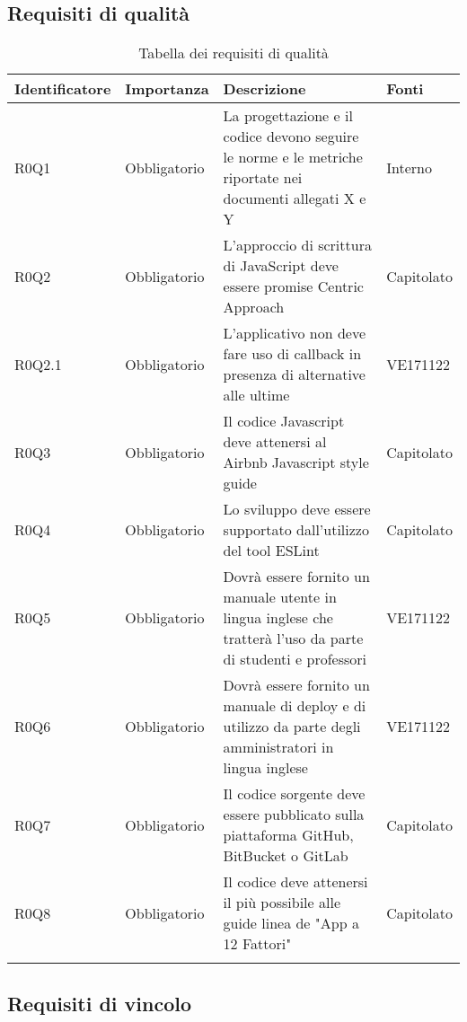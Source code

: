 \documentclass[AnalisiDeiRequisiti.tex]{subfiles}
\begin{document}
\subsection{Requisiti di qualità}

\label{table:Tabella requisiti di qualita'} %
\begin{longtable}[H]{|p{2.5cm}|p{2.5cm}|p{5cm}|p{2cm}|}
	\hline
	\rowcolor[HTML]{38FFF8} 
	\textbf{Identificatore} & \textbf{Importanza} & \textbf{Descrizione} & \textbf{Fonti} \\ \hline
	\endhead
	R0Q1 & Obbligatorio & La progettazione e il codice devono seguire le norme e le metriche riportate nei documenti allegati X e Y & Interno \\ \hline %
	R0Q2 & Obbligatorio & L'approccio di scrittura di JavaScript deve essere promise Centric Approach & Capitolato \\ \hline
	R0Q2.1 & Obbligatorio & L'applicativo non deve fare uso di callback in presenza di alternative alle ultime & VE171122 \\ \hline
	R0Q3 & Obbligatorio & Il codice Javascript deve attenersi al Airbnb Javascript style guide & Capitolato \\ \hline
	R0Q4 & Obbligatorio & Lo sviluppo deve essere supportato dall'utilizzo del tool ESLint & Capitolato \\ \hline
	R0Q5 & Obbligatorio & Dovrà essere fornito un manuale utente in lingua inglese che tratterà l'uso da parte di studenti e professori & VE171122 \\ \hline
	R0Q6 & Obbligatorio & Dovrà essere fornito un manuale di deploy e di utilizzo da parte degli amministratori in lingua inglese & VE171122 \\ \hline %
	R0Q7 & Obbligatorio & Il codice sorgente deve essere pubblicato sulla piattaforma GitHub, BitBucket o GitLab & Capitolato \\ \hline
	R0Q8 & Obbligatorio & Il codice deve attenersi il più possibile alle guide linea de "App a 12 Fattori" & Capitolato \\ \hline
	\caption{Tabella dei requisiti di qualità}
\end{longtable}

\subsection{Requisiti di vincolo}
\end{document}
